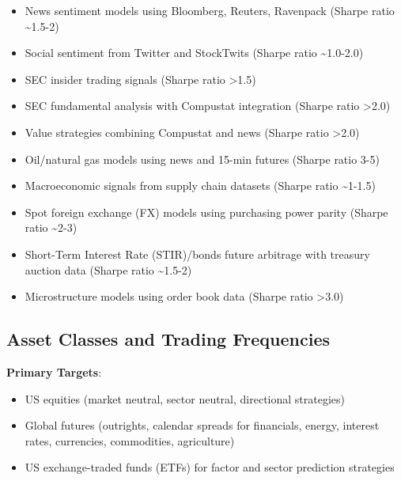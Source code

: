 \documentclass[11pt, letterpaper]{article}
\begin{document}
  \begin{itemize}
    \item News sentiment models using Bloomberg, Reuters, Ravenpack (Sharpe
      ratio \textasciitilde1.5-2)

    \item Social sentiment from Twitter and StockTwits (Sharpe ratio
      \textasciitilde1.0-2.0)

    \item SEC insider trading signals (Sharpe ratio \textgreater1.5)

    \item SEC fundamental analysis with Compustat integration (Sharpe
      ratio \textgreater2.0)

    \item Value strategies combining Compustat and news (Sharpe ratio
      \textgreater2.0)

    \item Oil/natural gas models using news and 15-min futures (Sharpe
      ratio 3-5)

    \item Macroeconomic signals from supply chain datasets (Sharpe ratio
      \textasciitilde1-1.5)

    \item Spot foreign exchange (FX) models using purchasing power parity
      (Sharpe ratio \textasciitilde2-3)

    \item Short-Term Interest Rate (STIR)/bonds future arbitrage with treasury
      auction data (Sharpe ratio \textasciitilde1.5-2)

    \item Microstructure models using order book data (Sharpe ratio
      \textgreater3.0)
  \end{itemize}

  \subsection{Asset Classes and Trading Frequencies}
  \label{asset-classes-and-trading-frequencies}

  \textbf{Primary Targets}:

  \begin{itemize}
    \item US equities (market neutral, sector neutral, directional
      strategies)

    \item Global futures (outrights, calendar spreads for financials,
      energy, interest rates, currencies, commodities, agriculture)

    \item US exchange-traded funds (ETFs) for factor and sector prediction
      strategies
  \end{itemize}
\end{document}

